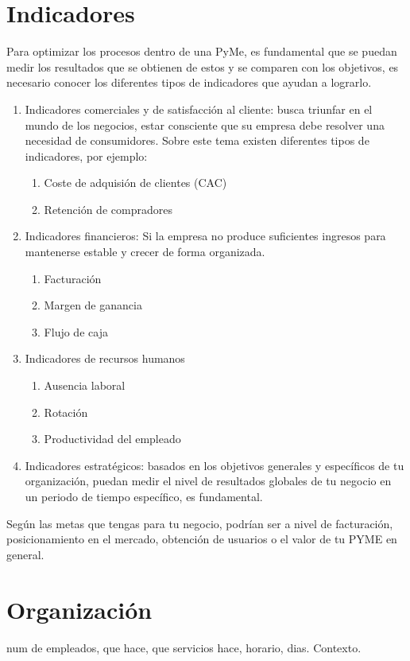 \documentclass[letterpaper,12pt]{article}
\begin{document}
\begin{sloppypar}
\section{Indicadores}
Para optimizar los procesos dentro de una PyMe, es fundamental que se puedan medir los resultados que se obtienen de estos y se comparen con los objetivos, es necesario conocer los diferentes tipos de indicadores que ayudan a lograrlo.

\begin{enumerate}
  \item Indicadores comerciales y de satisfacción al cliente: busca triunfar en el mundo de los negocios, estar consciente que su empresa debe resolver una necesidad de consumidores. 
  Sobre este tema existen diferentes tipos de indicadores, por ejemplo: 
  \begin{enumerate}
  	\item Coste de adquisión de clientes (CAC)
  	\item Retención de compradores 
  	\end{enumerate}
\item Indicadores financieros: Si la empresa no produce suficientes ingresos para mantenerse estable y crecer de forma organizada.
	\begin{enumerate}
		\item Facturación 
		\item Margen de ganancia 
		\item Flujo de caja
	\end{enumerate}
\item Indicadores de recursos humanos 
	\begin{enumerate}
		\item Ausencia laboral
		\item Rotación
		\item Productividad del empleado
	\end{enumerate}
\item Indicadores estratégicos: basados en los objetivos generales y específicos de tu organización, puedan medir el nivel de resultados globales de tu negocio en un periodo de tiempo específico, es fundamental.
\end{enumerate}

Según las metas que tengas para tu negocio, podrían ser a nivel de facturación, posicionamiento en el mercado, obtención de usuarios o el valor de tu PYME en general.

\section{Organización}
num de empleados, que hace, que servicios hace, horario, dias. 
Contexto. 





\end{sloppypar}
\end{document}
